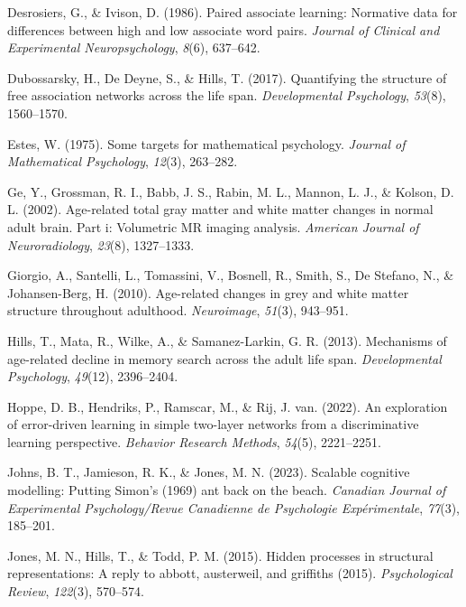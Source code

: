 \documentclass[
  man]{apa6}
\newlength{\cslhangindent}
\newlength{\cslentryspacingunit} %
\newenvironment{CSLReferences}[2] %
 {%
  \setlength{\parindent}{0pt}
  \ifodd #1
  \let\oldpar\par
  \def\par{\hangindent=\cslhangindent\oldpar}
  \fi
  \setlength{\parskip}{#2\cslentryspacingunit}
 }%
 {}
\begin{document}
\begin{CSLReferences}{1}{0}
\leavevmode{}%
Desrosiers, G., \& Ivison, D. (1986). Paired associate learning: Normative data for differences between high and low associate word pairs. \emph{Journal of Clinical and Experimental Neuropsychology}, \emph{8}(6), 637--642.

\leavevmode{}%
Dubossarsky, H., De Deyne, S., \& Hills, T. (2017). Quantifying the structure of free association networks across the life span. \emph{Developmental Psychology}, \emph{53}(8), 1560--1570.

\leavevmode{}%
Estes, W. (1975). Some targets for mathematical psychology. \emph{Journal of Mathematical Psychology}, \emph{12}(3), 263--282.

\leavevmode{}%
Ge, Y., Grossman, R. I., Babb, J. S., Rabin, M. L., Mannon, L. J., \& Kolson, D. L. (2002). Age-related total gray matter and white matter changes in normal adult brain. Part i: Volumetric MR imaging analysis. \emph{American Journal of Neuroradiology}, \emph{23}(8), 1327--1333.

\leavevmode{}%
Giorgio, A., Santelli, L., Tomassini, V., Bosnell, R., Smith, S., De Stefano, N., \& Johansen-Berg, H. (2010). Age-related changes in grey and white matter structure throughout adulthood. \emph{Neuroimage}, \emph{51}(3), 943--951.

\leavevmode{}%
Hills, T., Mata, R., Wilke, A., \& Samanez-Larkin, G. R. (2013). Mechanisms of age-related decline in memory search across the adult life span. \emph{Developmental Psychology}, \emph{49}(12), 2396--2404.

\leavevmode{}%
Hoppe, D. B., Hendriks, P., Ramscar, M., \& Rij, J. van. (2022). An exploration of error-driven learning in simple two-layer networks from a discriminative learning perspective. \emph{Behavior Research Methods}, \emph{54}(5), 2221--2251.

\leavevmode{}%
Johns, B. T., Jamieson, R. K., \& Jones, M. N. (2023). {Scalable cognitive modelling: Putting Simon's (1969) ant back on the beach.} \emph{Canadian Journal of Experimental Psychology/Revue Canadienne de Psychologie Exp{é}rimentale}, \emph{77}(3), 185--201.

\leavevmode{}%
Jones, M. N., Hills, T., \& Todd, P. M. (2015). Hidden processes in structural representations: A reply to abbott, austerweil, and griffiths (2015). \emph{Psychological Review}, \emph{122}(3), 570--574.


\end{CSLReferences}
\end{document}
